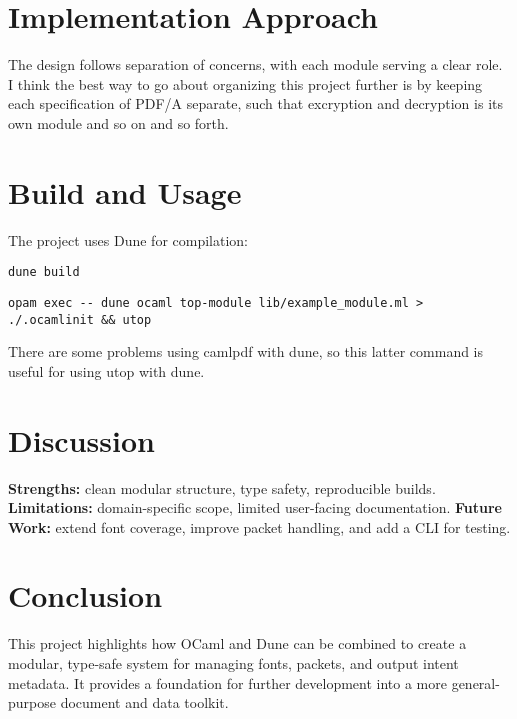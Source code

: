\documentclass[11pt]{article}
\begin{document}
\section*{Implementation Approach}
The design follows separation of concerns, with each module serving a clear role. 
I think the best way to go about organizing this project further is by keeping each specification of PDF/A separate,
such that excryption and decryption is its own module and so on and so forth. 

\section*{Build and Usage}
The project uses Dune for compilation:
\begin{verbatim}
dune build
\end{verbatim}
\begin{verbatim}
opam exec -- dune ocaml top-module lib/example_module.ml > ./.ocamlinit && utop
\end{verbatim}
There are some problems using camlpdf with dune, so this latter command is
useful for using utop with dune.

\section*{Discussion}
\textbf{Strengths:} clean modular structure, type safety, reproducible builds.  
\textbf{Limitations:} domain-specific scope, limited user-facing documentation.  
\textbf{Future Work:} extend font coverage, improve packet handling, and add a CLI for testing.

\section*{Conclusion}
This project highlights how OCaml and Dune can be combined to create a modular, type-safe system for managing fonts, packets, and output intent metadata. It provides a foundation for further development into a more general-purpose document and data toolkit.
\end{document}
